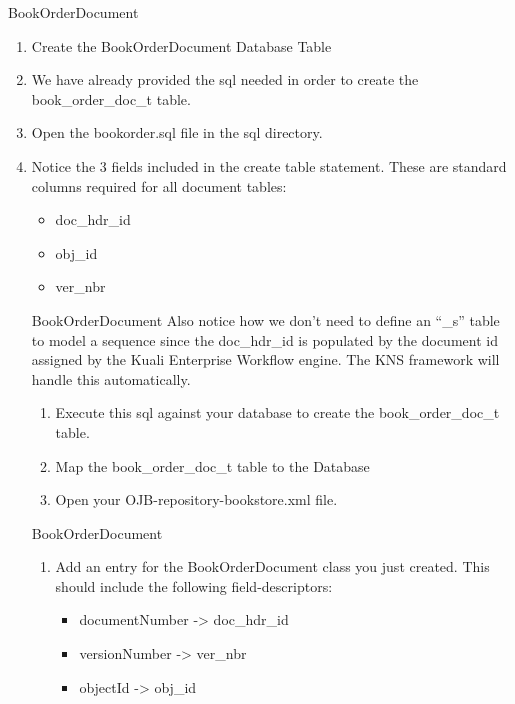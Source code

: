 \documentclass[xcolor=dvipsnames,14pt,professionalfonts]{beamer}
\begin{document}
\begin{frame}{BookOrderDocument}
\begin{enumerate}
\item Create the BookOrderDocument Database Table
  \item We have already provided the sql needed in order to create the book_order_doc_t table.
  \item Open the bookorder.sql file in the sql directory.
  \item Notice the 3 fields included in the create table statement.  These are standard columns required for all document tables:
    \begin{itemize}
      \item doc_hdr_id
      \item obj_id
      \item ver_nbr
      \end{itemize}

\begin{frame}{BookOrderDocument}
  Also notice how we don’t need to define an “_s” table to model a sequence since the doc_hdr_id is populated by the document id assigned by the Kuali Enterprise Workflow engine.  The KNS framework will handle this automatically.
\begin{enumerate}
\item Execute this sql against your database to create the book_order_doc_t table.
\item Map the book_order_doc_t table to the Database
\item Open your OJB-repository-bookstore.xml file.
\end{enumerate}
\end{frame}

\begin{frame}{BookOrderDocument}
\begin{enumerate}
\item Add an entry for the BookOrderDocument class you just created.
  This should include the following field-descriptors: 
  \begin{itemize}
  \item documentNumber -> doc_hdr_id
    \item versionNumber -> ver_nbr
    \item objectId -> obj_id
      \end{itemize}
\end{enumerate}
\end{frame}


\end{enumerate}
\end{frame}
\end{document}

